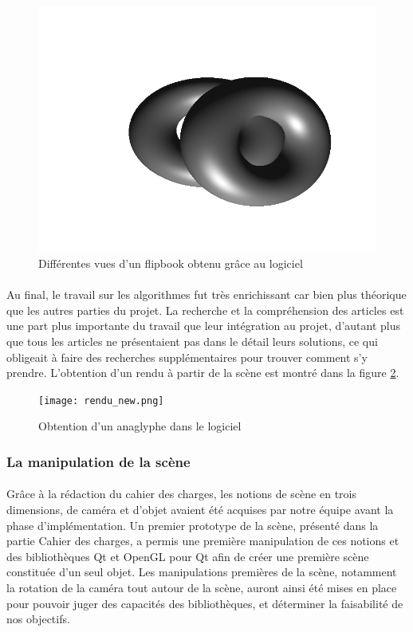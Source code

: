 \begin{figure}[H]
        \includegraphics[scale=0.2]{testGif8.png}
	\caption{\label{fig:flipbook_logiciel} Différentes vues d'un flipbook obtenu grâce au logiciel \protect}
\end{figure}

\paragraph{}
Au final, le travail sur les algorithmes fut très enrichissant car bien plus théorique que les autres parties du projet. La recherche et la compréhension des articles est une part plus importante du travail que leur intégration au projet, d'autant plus que tous les articles ne présentaient pas dans le détail leurs solutions, ce qui obligeait à faire des recherches supplémentaires pour trouver comment s'y prendre. L'obtention d'un rendu à partir de la scène est montré dans la figure \ref{fig:screenRendu}.

\begin{figure}[h]
	\centering
	\texttt{[image: rendu\_new.png]}
	\caption{\label{fig:screenRendu} Obtention d'un anaglyphe dans le logiciel \protect}
\end{figure}

\subsubsection{La manipulation de la scène}
\paragraph{}
Grâce à la rédaction du cahier des charges, les notions de scène en trois dimensions, de caméra et d'objet avaient été acquises par notre équipe avant la phase d'implémentation. Un premier prototype de la scène, présenté dans la partie Cahier des charges, a permis une première manipulation de ces notions et des bibliothèques Qt et OpenGL pour Qt afin de créer une première scène constituée d'un seul objet. Les manipulations premières de la scène, notamment la rotation de la caméra tout autour de la scène, auront ainsi été mises en place pour pouvoir juger des capacités des bibliothèques, et déterminer la faisabilité de nos objectifs.

